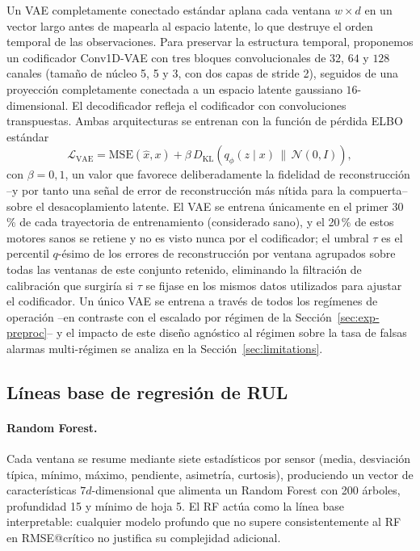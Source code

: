 \documentclass[5p,times,authoryear]{elsarticle}
\begin{document}
Un VAE completamente conectado estándar aplana cada ventana $w\times d$ en un vector largo antes de mapearla al espacio latente, lo que destruye el orden temporal de las observaciones. Para preservar la estructura temporal, proponemos un codificador Conv1D-VAE con tres bloques convolucionales de $32$, $64$ y $128$ canales (tamaño de núcleo 5, 5 y 3, con dos capas de stride 2), seguidos de una proyección completamente conectada a un espacio latente gaussiano $16$-dimensional. El decodificador refleja el codificador con convoluciones transpuestas. Ambas arquitecturas se entrenan con la función de pérdida ELBO estándar
\begin{equation}
\mathcal{L}_{\mathrm{VAE}} = \mathrm{MSE}(\hat x, x) + \beta\,D_{\mathrm{KL}}\!\left(q_\phi(z\mid x)\,\|\,\mathcal{N}(0,I)\right),
\label{eq:vae}
\end{equation}
con $\beta=0{,}1$, un valor que favorece deliberadamente la fidelidad de reconstrucción --y por tanto una señal de error de reconstrucción más nítida para la compuerta-- sobre el desacoplamiento latente. El VAE se entrena únicamente en el primer 30\,\% de cada trayectoria de entrenamiento (considerado sano), y el 20\,\% de estos motores sanos se retiene y no es visto nunca por el codificador; el umbral $\tau$ es el percentil $q$-ésimo de los errores de reconstrucción por ventana agrupados sobre todas las ventanas de este conjunto retenido, eliminando la filtración de calibración que surgiría si $\tau$ se fijase en los mismos datos utilizados para ajustar el codificador. Un único VAE se entrena a través de todos los regímenes de operación --en contraste con el escalado por régimen de la Sección~\ref{sec:exp-preproc}-- y el impacto de este diseño agnóstico al régimen sobre la tasa de falsas alarmas multi-régimen se analiza en la Sección~\ref{sec:limitations}.

\subsection{Líneas base de regresión de RUL}\label{sec:method-rul}

\paragraph{Random Forest.} Cada ventana se resume mediante siete estadísticos por sensor (media, desviación típica, mínimo, máximo, pendiente, asimetría, curtosis), produciendo un vector de características $7d$-dimensional que alimenta un Random Forest con 200 árboles, profundidad 15 y mínimo de hoja 5. El RF actúa como la línea base interpretable: cualquier modelo profundo que no supere consistentemente al RF en RMSE@crítico no justifica su complejidad adicional.
\end{document}
